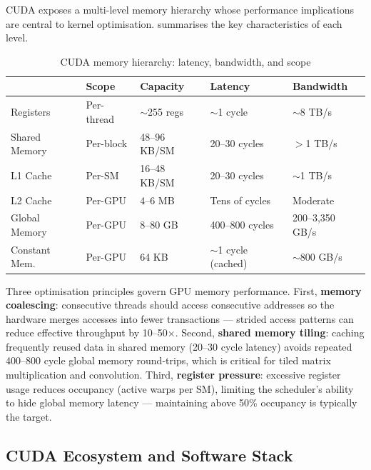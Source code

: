 CUDA exposes a multi-level memory hierarchy whose performance implications
are central to kernel optimisation.  summarises the
key characteristics of each level.

\begin{table}[htbp]
  \centering
  \caption{CUDA memory hierarchy: latency, bandwidth, and scope}
  \label{tab:cuda-memory}
  \begin{tabularx}{\textwidth}{llllX}
    \toprule
    \tableheader{Memory Type & Scope & Capacity & Latency & Bandwidth} \\
    \midrule
    Registers      & Per-thread & $\sim$255 regs & $\sim$1 cycle  & $\sim$8 TB/s \\
    \rowcolor{TableRowOdd}
    Shared Memory  & Per-block  & 48–96 KB/SM  & 20–30 cycles & $>$1 TB/s \\
    L1 Cache       & Per-SM     & 16–48 KB/SM  & 20–30 cycles & $\sim$1 TB/s \\
    \rowcolor{TableRowOdd}
    L2 Cache       & Per-GPU    & 4–6 MB       & Tens of cycles & Moderate \\
    Global Memory  & Per-GPU    & 8–80 GB      & 400–800 cycles & 200–3,350 GB/s \\
    \rowcolor{TableRowOdd}
    Constant Mem.  & Per-GPU    & 64 KB        & $\sim$1 cycle (cached) & $\sim$800 GB/s \\
    \bottomrule
  \end{tabularx}
\end{table}

Three optimisation principles govern GPU memory performance. First,
\textbf{memory coalescing}: consecutive threads should access consecutive
addresses so the hardware merges accesses into fewer transactions —
strided access patterns can reduce effective throughput by 10–50$\times$.
Second, \textbf{shared memory tiling}: caching frequently reused data in
shared memory (20–30 cycle latency) avoids repeated 400–800 cycle global
memory round-trips, which is critical for tiled matrix multiplication and
convolution. Third, \textbf{register pressure}: excessive register usage
reduces occupancy (active warps per SM), limiting the scheduler's ability
to hide global memory latency — maintaining above 50\% occupancy is
typically the target.

\subsection{CUDA Ecosystem and Software Stack}
\label{subsec:cuda-ecosystem}

